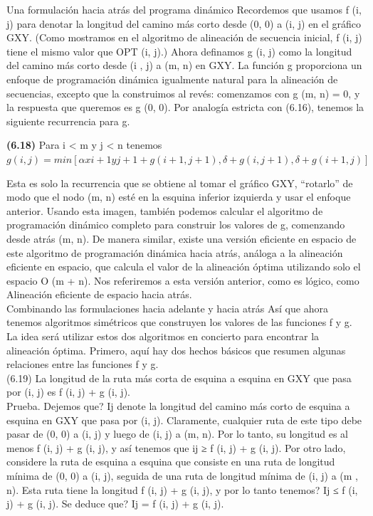 \documentclass[a4paper, 12pt]{book}
\theoremstyle{dotless}
\begin{document}
Una formulación hacia atrás del programa dinámico Recordemos que usamos f (i, j) para denotar la longitud del camino más corto desde (0, 0) a (i, j) en el gráfico GXY. (Como mostramos en el algoritmo de alineación de secuencia inicial, f (i, j) tiene el mismo valor que OPT (i, j).) Ahora definamos g (i, j) como la longitud del camino más corto desde (i , j) a (m, n) en GXY. La función g proporciona un enfoque de programación dinámica igualmente natural para la alineación de secuencias, excepto que la construimos al revés: comenzamos con g (m, n) = 0, y la respuesta que queremos es g (0, 0). Por analogía estricta con (6.16), tenemos la siguiente recurrencia para g.\\


\colorbox{mygray}{\parbox{15cm}{
\textbf{(6.18)} Para i < m y j < n tenemos
$g(i, j) = min[ \alpha xi+1yj+1 + g(i + 1, j + 1),  \delta  + g(i, j + 1),  \delta  + g(i + 1, j)]$
}}

Esta es solo la recurrencia que se obtiene al tomar el gráfico GXY, ``rotarlo'' de modo que el nodo (m, n) esté en la esquina inferior izquierda y usar el enfoque anterior. Usando esta imagen, también podemos calcular el algoritmo de programación dinámico completo para construir los valores de g, comenzando desde atrás (m, n). De manera similar, existe una versión eficiente en espacio de este algoritmo de programación dinámica hacia atrás, análoga a la alineación eficiente en espacio, que calcula el valor de la alineación óptima utilizando solo el espacio O (m + n). Nos referiremos a esta versión anterior, como es lógico, como Alineación eficiente de espacio hacia atrás.\\

Combinando las formulaciones hacia adelante y hacia atrás Así que ahora tenemos algoritmos simétricos que construyen los valores de las funciones f y g. La idea será utilizar estos dos algoritmos en concierto para encontrar la alineación óptima. Primero, aquí hay dos hechos básicos que resumen algunas relaciones entre las funciones f y g.\\

(6.19) La longitud de la ruta más corta de esquina a esquina en GXY que pasa por (i, j) es f (i, j) + g (i, j).\\

Prueba. Dejemos que? Ij denote la longitud del camino más corto de esquina a esquina en GXY que pasa por (i, j). Claramente, cualquier ruta de este tipo debe pasar de (0, 0) a (i, j) y luego de (i, j) a (m, n). Por lo tanto, su longitud es al menos f (i, j) + g (i, j), y así tenemos que ij ≥ f (i, j) + g (i, j). Por otro lado, considere la ruta de esquina a esquina que consiste en una ruta de longitud mínima de (0, 0) a (i, j), seguida de una ruta de longitud mínima de (i, j) a (m , n). Esta ruta tiene la longitud f (i, j) + g (i, j), y por lo tanto tenemos? Ij ≤ f (i, j) + g (i, j). Se deduce que? Ij = f (i, j) + g (i, j).\\
\end{document}
